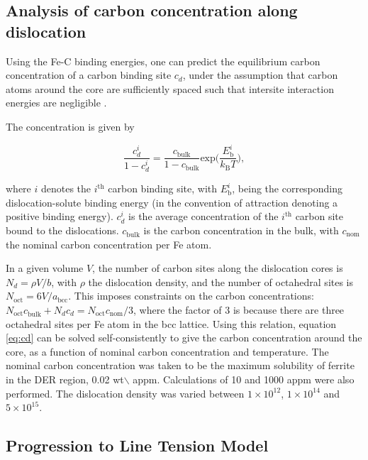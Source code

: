 \documentclass[a4paper,11pt]{article}
\begin{document}
\subsection{Analysis of carbon concentration along dislocation}
\label{sec:org3c467d0}

Using the Fe-C binding energies, one can predict the equilibrium carbon concentration of a carbon
binding site \(c_d\), under the assumption that carbon atoms around the core are sufficiently spaced such that intersite
interaction energies are negligible \cite{Ventelon2015}.

The concentration is given by 

\begin{equation}
\frac{ c_d^{i} }{1 -  c_d^{i} } = \frac{ c_{\text{bulk}}^{} }{1 - c_{\text{bulk}} } \text{exp} \Big( 
\frac{E_{\text{b}}^i}{k_{\text{B}}T}  \Big),    \label{eq:cd}
\end{equation}


where \(i\) denotes the \(i^{\text{th}}\) carbon binding site, with \(E_{\text{b}}^{i}\), being the
corresponding dislocation-solute binding energy (in the convention of attraction
denoting a positive binding energy). \(c_d^{i}\) is the average concentration of the \(i^{\text{th}}\) carbon
site bound to the dislocations. \(c_{\text{bulk}}^{}\) is the carbon concentration in the bulk, with
\(c_{\text{nom}}^{}\) the nominal carbon concentration per Fe atom.


In a given volume \(V\), the number of carbon sites along the dislocation cores is \(N_d = \rho V/b\),
with \(\rho\) the dislocation density, and the number of octahedral sites is \(N_{\text{oct}} =
    6V/a_{\text{bcc}}\). This imposes constraints on the carbon concentrations: \(N_{\text{oct}}
    c_{\text{bulk}}^{} + N_d c_d = N_{\text{oct}} c_{\text{nom}}/3\), where the factor of 3 is because there are
three octahedral sites per Fe atom in the bcc lattice. Using this relation, equation \ref{eq:cd}
can be solved self-consistently to give the carbon concentration around the core, as a
function of nominal carbon concentration and temperature. The nominal carbon concentration was
taken to be the maximum solubility of ferrite in the DER region, 0.02 wt$\backslash$%
appm. Calculations of 10 and 1000 appm were also performed. The dislocation density was varied
between \(1\times10^{12}\), \(1\times10^{14}\) and \(5\times10^{15}\).


\subsection{Progression to Line Tension Model}
\label{sec:orgfa96288}
\end{document}
